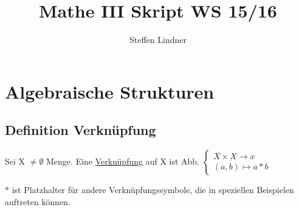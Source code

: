 \documentclass[a4paper, openany]{book}
\author{Steffen Lindner}
\title{\vspace{-2cm}Mathe III Skript WS 15/16}
\begin{document}
\maketitle

\tableofcontents

\chapter{Algebraische Strukturen}
\section{Definition Verknüpfung}

Sei X $\neq \emptyset$ Menge. Eine \underline{Verknüpfung} auf X ist Abb. 
$\begin{cases}
    X \times X \rightarrow x \\
    (a,b) \mapsto a \ast b
\end{cases}$

$\ast$ ist Platzhalter für andere Verknüpfungssymbole, die in speziellen Beispielen auftreten können.
\end{document}
